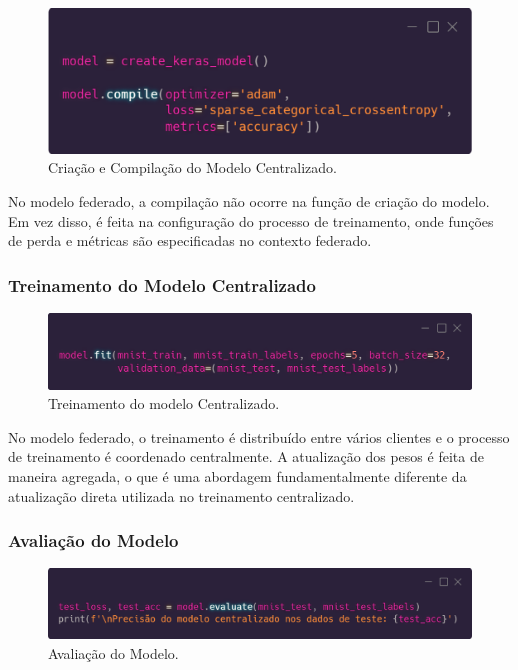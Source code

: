 \begin{figure}[ht]
    \centering
    \includegraphics[scale=0.25]{figuras/compileModelCentralized.eps}
    \caption{Criação e Compilação do Modelo Centralizado.}
    \label{fig:compileModelCentralized}
\end{figure}

No modelo federado, a compilação não ocorre na função de criação do modelo. Em vez disso, é feita na configuração do processo de treinamento, onde funções de perda e métricas são especificadas no contexto federado.

\subsubsection{Treinamento do Modelo Centralizado}

\begin{figure}[ht]
    \centering
    \includegraphics[scale=0.25]{figuras/trainingCentralized.eps}
    \caption{Treinamento do modelo Centralizado.}
    \label{fig:trainingCentralized}
\end{figure}

No modelo federado, o treinamento é distribuído entre vários clientes e o processo de treinamento é coordenado centralmente. A atualização dos pesos é feita de maneira agregada, o que é uma abordagem fundamentalmente diferente da atualização direta utilizada no treinamento centralizado.

\subsubsection{Avaliação do Modelo}

\begin{figure}[ht]
    \centering
    \includegraphics[scale=0.25]{figuras/testCentralized.eps}
    \caption{Avaliação do Modelo.}
    \label{fig:testCentralized}
\end{figure}

